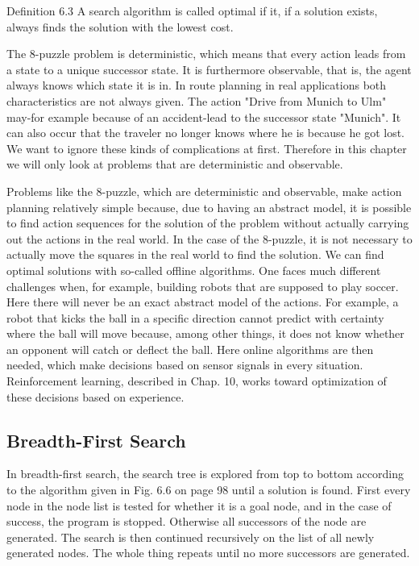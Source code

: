 \documentclass[10pt]{book}
\begin{document}
Definition 6.3 A search algorithm is called optimal if it, if a solution exists, always finds the solution with the lowest cost.

The 8-puzzle problem is deterministic, which means that every action leads from a state to a unique successor state. It is furthermore observable, that is, the agent always knows which state it is in. In route planning in real applications both characteristics are not always given. The action "Drive from Munich to Ulm" may-for example because of an accident-lead to the successor state "Munich". It can also occur that the traveler no longer knows where he is because he got lost. We want to ignore these kinds of complications at first. Therefore in this chapter we will only look at problems that are deterministic and observable.

Problems like the 8-puzzle, which are deterministic and observable, make action planning relatively simple because, due to having an abstract model, it is possible to find action sequences for the solution of the problem without actually carrying out the actions in the real world. In the case of the 8-puzzle, it is not necessary to actually move the squares in the real world to find the solution. We can find optimal solutions with so-called offline algorithms. One faces much different challenges when, for example, building robots that are supposed to play soccer. Here there will never be an exact abstract model of the actions. For example, a robot that kicks the ball in a specific direction cannot predict with certainty where the ball will move because, among other things, it does not know whether an opponent will catch or deflect the ball. Here online algorithms are then needed, which make decisions based on sensor signals in every situation. Reinforcement learning, described in Chap. 10, works toward optimization of these decisions based on experience.

\subsection{Breadth-First Search}
In breadth-first search, the search tree is explored from top to bottom according to the algorithm given in Fig. 6.6 on page 98 until a solution is found. First every node in the node list is tested for whether it is a goal node, and in the case of success, the program is stopped. Otherwise all successors of the node are generated. The search is then continued recursively on the list of all newly generated nodes. The whole thing repeats until no more successors are generated.
\end{document}
